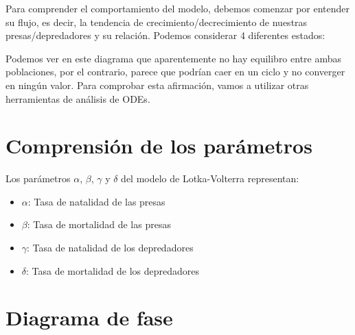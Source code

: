 \documentclass{article}
\begin{document}
Para comprender el comportamiento del modelo, debemos comenzar por entender su flujo, es decir, la tendencia de crecimiento/decrecimiento de nuestras presas/depredadores y su relación.
Podemos considerar 4 diferentes estados:

\begin{center}
\end{center}

Podemos ver en este diagrama que aparentemente no hay equilibro entre ambas poblaciones, por el contrario, parece que podrían caer en un ciclo y no converger en ningún valor. Para comprobar esta afirmación, vamos a utilizar otras herramientas de análisis de ODEs.

\section{Comprensión de los parámetros}

Los parámetros $\alpha$, $\beta$, $\gamma$ y $\delta$ del modelo de Lotka-Volterra representan:

\begin{itemize}
    \item{$\alpha$: Tasa de natalidad de las presas}
    \item{$\beta$: Tasa de mortalidad de las presas}
    \item{$\gamma$: Tasa de natalidad de los depredadores}
    \item{$\delta$: Tasa de mortalidad de los depredadores}
\end{itemize}

\pagebreak
\section{Diagrama de fase}
\end{document}

